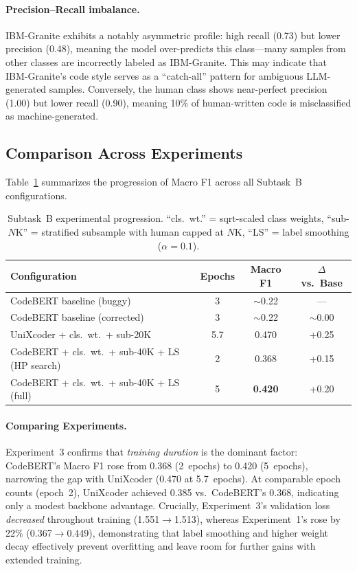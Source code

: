 \documentclass[11pt]{article}
\begin{document}
\paragraph{Precision--Recall imbalance.} IBM-Granite exhibits a notably asymmetric profile: high recall (0.73) but lower precision (0.48), meaning the model over-predicts this class---many samples from other classes are incorrectly labeled as IBM-Granite. This may indicate that IBM-Granite's code style serves as a ``catch-all'' pattern for ambiguous LLM-generated samples. Conversely, the human class shows near-perfect precision (1.00) but lower recall (0.90), meaning 10\% of human-written code is misclassified as machine-generated.

\subsection{Comparison Across Experiments}

Table~\ref{tab:taskB_comparison} summarizes the progression of Macro F1 across all Subtask~B configurations.

\begin{table}[htbp]
\centering
\footnotesize
\begin{tabularx}{\columnwidth}{@{}X c c c@{}}
\toprule
\textbf{Configuration} & \textbf{Epochs} & \textbf{Macro F1} & \textbf{$\Delta$ vs.\ Base} \\ \midrule
CodeBERT baseline (buggy) & 3 & $\sim$0.22 & --- \\
CodeBERT baseline (corrected) & 3 & $\sim$0.22 & $\sim$0.00 \\
UniXcoder + cls.\ wt.\ + sub-20K & 5.7 & 0.470 & +0.25 \\
CodeBERT + cls.\ wt.\ + sub-40K + LS (HP search) & 2 & 0.368 & +0.15 \\
CodeBERT + cls.\ wt.\ + sub-40K + LS (full) & 5 & \textbf{0.420} & +0.20 \\
\bottomrule
\end{tabularx}
\caption{Subtask~B experimental progression. ``cls.\ wt.'' = sqrt-scaled class weights, ``sub-$N$K'' = stratified subsample with human capped at $N$K, ``LS'' = label smoothing ($\alpha = 0.1$).}
\label{tab:taskB_comparison}
\end{table}

\paragraph{Comparing Experiments.}
Experiment~3 confirms that \textit{training duration} is the dominant factor: CodeBERT's Macro F1 rose from 0.368 (2~epochs) to 0.420 (5~epochs), narrowing the gap with UniXcoder (0.470 at 5.7~epochs). At comparable epoch counts (epoch~2), UniXcoder achieved 0.385 vs.\ CodeBERT's 0.368, indicating only a modest backbone advantage. Crucially, Experiment~3's validation loss \emph{decreased} throughout training (1.551$\to$1.513), whereas Experiment~1's rose by 22\% (0.367$\to$0.449), demonstrating that label smoothing and higher weight decay effectively prevent overfitting and leave room for further gains with extended training.
\end{document}
